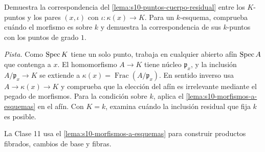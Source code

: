 \begin{ejer}
\label{ejer:s10-puntos-cuerpo-residual}
Demuestra la correspondencia del \cref{lema:s10-puntos-cuerpo-residual} entre los \(K\)-puntos y los pares \((x,\iota)\) con \(\iota\colon\kappa(x)\to K\). Para un \(k\)-esquema, comprueba cuándo el morfismo es sobre \(k\) y demuestra la correspondencia de sus \(k\)-puntos con los puntos de grado \(1\).

\emph{Pista.} Como \(\operatorname{Spec} K\) tiene un solo punto, trabaja en cualquier abierto afín \(\operatorname{Spec} A\) que contenga a \(x\). El homomorfismo \(A\to K\) tiene núcleo \(\mathfrak p_x\), y la inclusión \(A/\mathfrak p_x\to K\) se extiende a \(\kappa(x)=\operatorname{Frac}(A/\mathfrak p_x)\). En sentido inverso usa \(A\to\kappa(x)\to K\) y comprueba que la elección del afín es irrelevante mediante el pegado de morfismos. Para la condición sobre \(k\), aplica el \cref{lema:s10-morfismos-a-esquemas} en el afín. Con \(K=k\), examina cuándo la inclusión residual que fija \(k\) es posible.
\end{ejer}

La Clase 11 usa el \cref{lema:s10-morfismos-a-esquemas} para construir productos fibrados, cambios de base y fibras.
